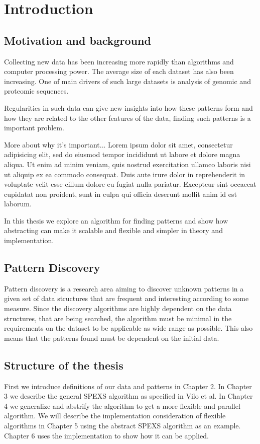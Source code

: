 \chapter{Introduction}

\section{Motivation and background}

Collecting new data has been increasing more rapidly than algorithms and
computer processing power. The average size of each dataset has also
been increasing. One of main drivers of such large datasets is analysis
of genomic and proteomic sequences.

Regularities in such data can give new insights into how these patterns form
and how they are related to the other features of the data, finding such
patterns is a important problem.


More about why it's important... Lorem ipsum dolor sit amet, consectetur 
adipisicing elit, sed do eiusmod
tempor incididunt ut labore et dolore magna aliqua. Ut enim ad minim veniam,
quis nostrud exercitation ullamco laboris nisi ut aliquip ex ea commodo
consequat. Duis aute irure dolor in reprehenderit in voluptate velit esse
cillum dolore eu fugiat nulla pariatur. Excepteur sint occaecat cupidatat non
proident, sunt in culpa qui officia deserunt mollit anim id est laborum.

In this thesis we explore an algorithm for finding patterns and show how
abstracting can make it scalable and flexible and simpler in theory and
implementation.

\section{Pattern Discovery}

Pattern discovery is a research area aiming to discover unknown patterns
in a given set of data structures that are frequent and interesting according 
to some measure. Since the discovery algorithms are highly dependent on the
data structures, that are being searched, the algorithm must be minimal
in the requirements on the dataset to be applicable as wide range as possible.
This also means that the patterns found must be dependent on the initial data.


\section{Structure of the thesis}

First we introduce definitions of our data and patterns in Chapter 2. In
Chapter 3 we describe the general SPEXS algorithm as specified in Vilo et al.
In Chapter 4 we generalize and abstrify the algorithm to get a more flexible
and parallel algorithm. We will describe the implementation consideration of
flexible algorithms in Chapter 5 using the abstract SPEXS algorithm as an
example. Chapter 6 uses the implementation to show how it can be applied.